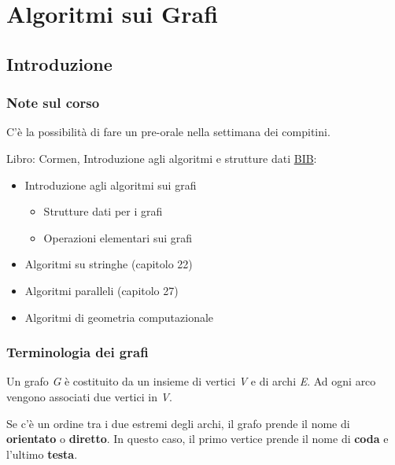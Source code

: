 \chapter{Algoritmi sui Grafi}

\section{Introduzione}

\subsection{Note sul corso}
C'è la possibilità di fare un pre-orale nella settimana dei compitini.

Libro: Cormen, Introduzione agli algoritmi e strutture dati
\href{http://catalogo.unipd.it/F/FCKK1DACESL2TDH5CF15FLDL2BUM936U1XG9U15MFDCKI764BV-10675?func=full-set-set\&set_number=011139\&set_entry=000001\&format=999}{BIB}:

\begin{itemize}
\item
  Introduzione agli algoritmi sui grafi
  \begin{itemize}
  \item
    Strutture dati per i grafi
  \item
    Operazioni elementari sui grafi
  \end{itemize}
\item
  Algoritmi su stringhe (capitolo 22)
\item
  Algoritmi paralleli (capitolo 27)
\item
  Algoritmi di geometria computazionale
\end{itemize}

\subsection{Terminologia dei grafi}\label{terminologia-dei-grafi}

Un grafo \emph{G} è costituito da un insieme di vertici \emph{V} e di
archi \emph{E}. Ad ogni arco vengono associati due vertici in \emph{V}.

Se c'è un ordine tra i due estremi degli archi, il grafo prende il nome
di \textbf{orientato} o \textbf{diretto}. In questo caso, il primo
vertice prende il nome di \textbf{coda} e l'ultimo \textbf{testa}.

